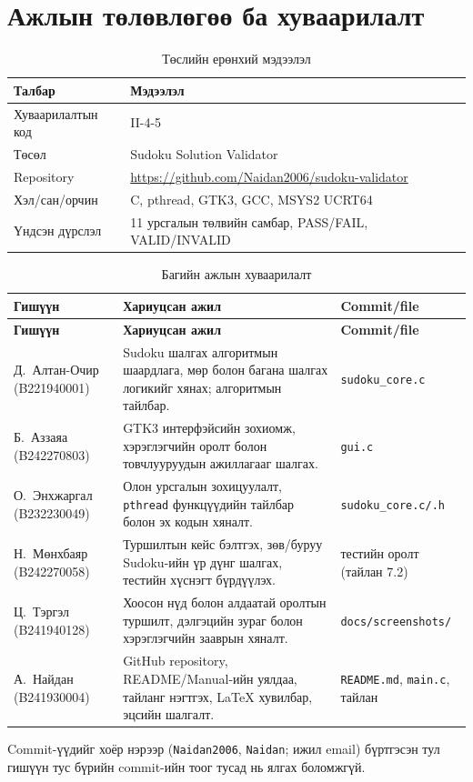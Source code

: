 \documentclass[12pt,a4paper]{report}
\newcommand{\repo}{\url{https://github.com/Naidan2006/sudoku-validator}}
\begin{document}
\appendix
\chapter{Ажлын төлөвлөгөө ба хуваарилалт}
\begin{table}[H]\centering\caption{Төслийн ерөнхий мэдээлэл}\begin{tabular}{P{0.28\textwidth}P{0.62\textwidth}}\toprule
\textbf{Талбар}&\textbf{Мэдээлэл}\\\midrule
Хуваарилалтын код&II-4-5\\
Төсөл&Sudoku Solution Validator\\
Repository&\repo\\
Хэл/сан/орчин&C, pthread, GTK3, GCC, MSYS2 UCRT64\\
Үндсэн дүрслэл&11 урсгалын төлвийн самбар, PASS/FAIL, VALID/INVALID\\\bottomrule\end{tabular}\end{table}
\begin{longtable}{P{0.3\textwidth}P{0.4\textwidth}P{0.2\textwidth}}
\caption{Багийн ажлын хуваарилалт}\\
\toprule
\textbf{Гишүүн} & \textbf{Хариуцсан ажил} & \textbf{Commit/file}\\
\midrule\endfirsthead
\toprule\textbf{Гишүүн} & \textbf{Хариуцсан ажил} & \textbf{Commit/file}\\\midrule\endhead
Д.~Алтан-Очир (B221940001) & Sudoku шалгах алгоритмын шаардлага, мөр болон багана шалгах логикийг хянах; алгоритмын тайлбар. & \texttt{sudoku\_core.c}\\
Б.~Аззаяа (B242270803) & GTK3 интерфэйсийн зохиомж, хэрэглэгчийн оролт болон товчлууруудын ажиллагааг шалгах. & \texttt{gui.c}\\
О.~Энхжаргал (B232230049) & Олон урсгалын зохицуулалт, \texttt{pthread} функцүүдийн тайлбар болон эх кодын хяналт. & \texttt{sudoku\_core.c/.h}\\
Н.~Мөнхбаяр (B242270058) & Туршилтын кейс бэлтгэх, зөв/буруу Sudoku-ийн үр дүнг шалгах, тестийн хүснэгт бүрдүүлэх. & тестийн оролт (тайлан 7.2)\\
Ц.~Тэргэл (B241940128) & Хоосон нүд болон алдаатай оролтын туршилт, дэлгэцийн зураг болон хэрэглэгчийн зааврын хяналт. & \texttt{docs/screenshots/}\\
А.~Найдан (B241930004) & GitHub repository, README/Manual-ийн уялдаа, тайланг нэгтгэх, LaTeX хувилбар, эцсийн шалгалт. & \texttt{README.md}, \texttt{main.c}, тайлан\\
\bottomrule
\end{longtable}
Commit-үүдийг хоёр нэрээр (\texttt{Naidan2006}, \texttt{Naidan}; ижил email) бүртгэсэн тул гишүүн тус бүрийн commit-ийн тоог тусад нь ялгах боломжгүй.
\end{document}
